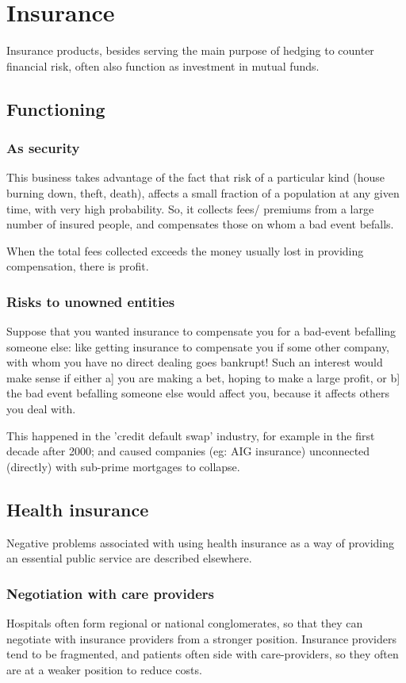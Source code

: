 \documentclass[oneside, article]{memoir}
\begin{document}
\chapter{Insurance}
Insurance products, besides serving the main purpose of hedging to counter financial risk, often also function as investment in mutual funds.

\section{Functioning}
\subsection{As security}
This business takes advantage of the fact that risk of a particular kind (house burning down, theft, death), affects a small fraction of a population at any given time, with very high probability. So, it collects fees/ premiums from a large number of insured people, and compensates those on whom a bad event befalls.

When the total fees collected exceeds the money usually lost in providing compensation, there is profit.

\subsection{Risks to unowned entities}
Suppose that you wanted insurance to compensate you for a bad-event befalling someone else: like getting insurance to compensate you if some other company, with whom you have no direct dealing goes bankrupt! Such an interest would make sense if either a] you are making a bet, hoping to make a large profit, or b] the bad event befalling someone else would affect you, because it affects others you deal with.

This happened in the 'credit default swap' industry, for example in the first decade after 2000; and caused companies (eg: AIG insurance) unconnected (directly) with sub-prime mortgages to collapse.

\section{Health insurance}
Negative problems associated with using health insurance as a way of providing an essential public service are described elsewhere.

\subsection{Negotiation with care providers}
Hospitals often form regional or national conglomerates, so that they can negotiate with insurance providers from a stronger position. Insurance providers tend to be fragmented, and patients often side with care-providers, so they often are at a weaker position to reduce costs.
\end{document}
